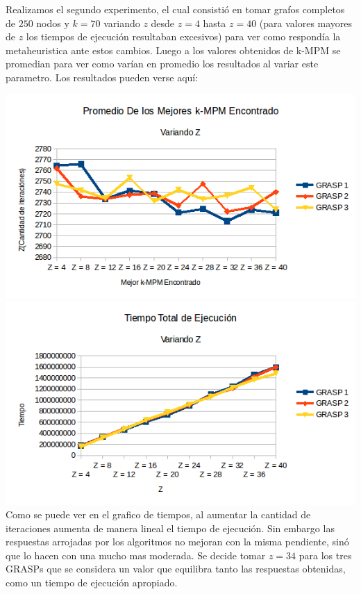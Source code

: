 Realizamos el segundo experimento, el cual consistió en tomar grafos completos de $250$ nodos y $k = 70$ variando $z$ desde $z = 4$ hasta $z = 40$ (para valores mayores de $z$ los tiempos de ejecución resultaban excesivos) para ver como respondía la metaheuristica ante estos cambios. Luego a los valores obtenidos de k-MPM se promedian para ver como varían en promedio los resultados al variar este parametro.
Los resultados pueden verse aquí:

\includegraphics[scale=0.7]{Ej5/promedioZ.png}\\

\includegraphics[scale=0.7]{Ej5/tiemposZ.png}\\

Como se puede ver en el grafico de tiempos, al aumentar la cantidad de iteraciones aumenta de manera lineal el tiempo de ejecución. Sin embargo las respuestas arrojadas por los algoritmos no mejoran con la misma pendiente, sinó que lo hacen con una mucho mas moderada. Se decide tomar $z = 34$ para los tres GRASPs que se considera un valor que equilibra tanto las respuestas obtenidas, como un tiempo de ejecución apropiado. 

